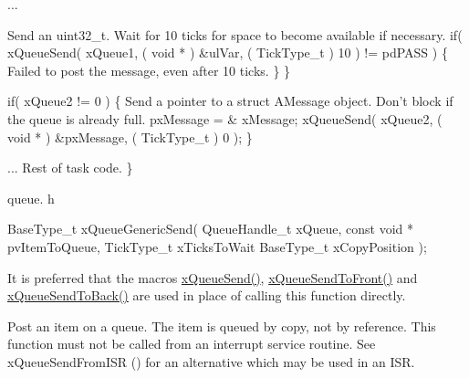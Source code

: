 \begin{DoxyPre}...
\begin{DoxyVerb}if( xQueue1 != 0 )
{
\end{DoxyVerb}

Send an uint32\_t.  Wait for 10 ticks for space to become
available if necessary.
        if( xQueueSend( xQueue1, ( void * ) \&ulVar, ( TickType\_t ) 10 ) != pdPASS )
        \{
Failed to post the message, even after 10 ticks.
        \}
    \}\end{DoxyPre}



\begin{DoxyPre}    if( xQueue2 != 0 )
    \{
Send a pointer to a struct AMessage object.  Don't block if the
queue is already full.
        pxMessage = \& xMessage;
        xQueueSend( xQueue2, ( void * ) \&pxMessage, ( TickType\_t ) 0 );
    \}\end{DoxyPre}



\begin{DoxyPre}... Rest of task code.
 \}
 \end{DoxyPre}


queue. h 
\begin{DoxyPre}
 BaseType\_t xQueueGenericSend(
                                    QueueHandle\_t xQueue,
                                    const void * pvItemToQueue,
                                    TickType\_t xTicksToWait
                                    BaseType\_t xCopyPosition
                                );
   \end{DoxyPre}


It is preferred that the macros \hyperlink{queue_8h_af7eb49d3249351176992950d9185abe9}{x\-Queue\-Send()}, \hyperlink{queue_8h_aa612fcc2b1ceee0200f34b942e300b41}{x\-Queue\-Send\-To\-Front()} and \hyperlink{queue_8h_a81d24a2c1199d58efb76fbee15853112}{x\-Queue\-Send\-To\-Back()} are used in place of calling this function directly.

Post an item on a queue. The item is queued by copy, not by reference. This function must not be called from an interrupt service routine. See x\-Queue\-Send\-From\-I\-S\-R () for an alternative which may be used in an I\-S\-R.


